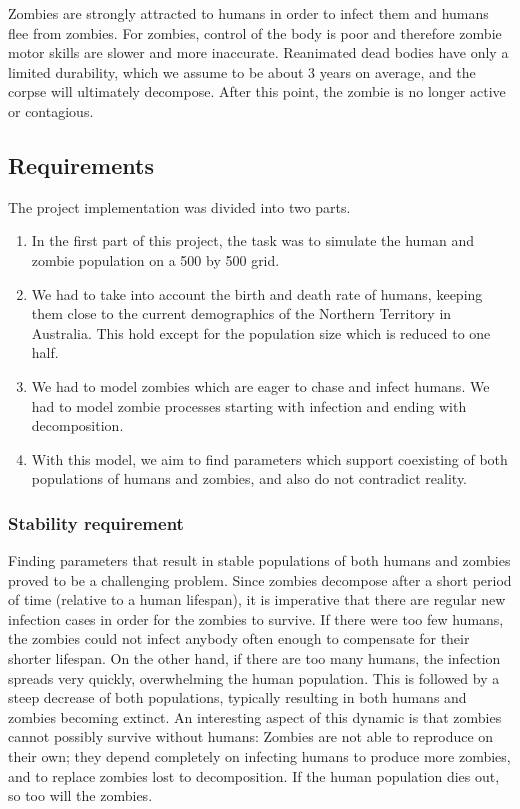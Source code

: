\documentclass[a4paper]{article}
\begin{document}
Zombies are strongly attracted to humans in order to infect them and humans flee from zombies.
For zombies, control of the body is poor and therefore zombie motor skills are slower and more inaccurate.
Reanimated dead bodies have only a limited durability, which we assume to be about 3 years on average\cite{zombiepedia}, and the corpse will ultimately decompose.
After this point, the zombie is no longer active or contagious.

\subsection{Requirements}

The project implementation was divided into two parts.

\begin{enumerate}
\item In the first part of this project, the task was to simulate the human and zombie population on a 500 by 500 grid.
\item We had to take into account the birth and death rate of humans, keeping them close to the current demographics of the Northern Territory in Australia.
    This hold except for the population size which is reduced to one half. \cite{project}
\item We had to model zombies which are eager to chase and infect humans.
    We had to model zombie processes starting with infection and ending with decomposition.
\item With this model, we aim to find parameters which support coexisting of both populations of humans and zombies, and also do not contradict reality.
\end{enumerate}

\subsubsection{Stability requirement}

Finding parameters that result in stable populations of both humans and zombies proved to be a challenging problem.
Since zombies decompose after a short period of time (relative to a human lifespan), it is imperative that there are regular new infection cases in order for the zombies to survive.
If there were too few humans, the zombies could not infect anybody often enough to compensate for their shorter lifespan.
On the other hand, if there are too many humans, the infection spreads very quickly, overwhelming the human population. 
This is followed by a steep decrease of both populations, typically resulting in both humans and zombies becoming extinct.
An interesting aspect of this dynamic is that zombies cannot possibly survive without humans: Zombies are not able to reproduce on their own; they depend completely on infecting humans to produce more zombies, and to replace zombies lost to decomposition. 
If the human population dies out, so too will the zombies.
\end{document}
